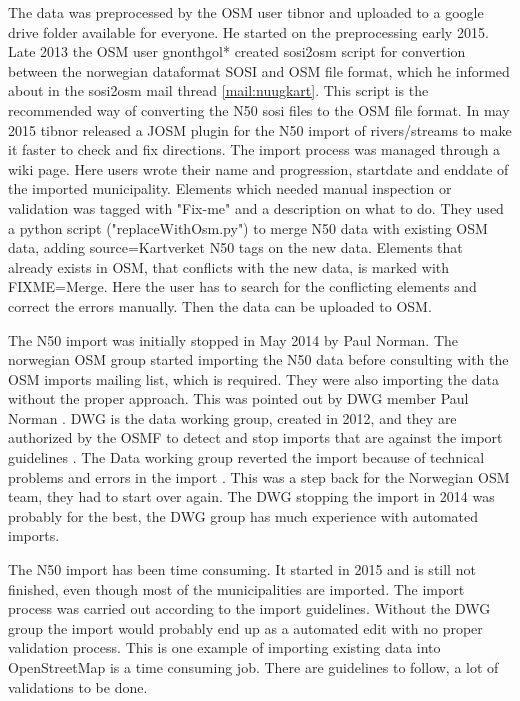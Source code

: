 The data was preprocessed by the OSM user tibnor and uploaded to a google drive folder available for everyone. He started on the preprocessing early 2015. Late 2013 the OSM user gnonthgol* created sosi2osm script for convertion between the norwegian dataformat SOSI and OSM file format, which he informed about in the sosi2osm mail thread \ref{mail:nuugkart}. This script is the recommended way of converting the N50 sosi files to the OSM file format. In may 2015 tibnor released a JOSM plugin for the N50 import of rivers/streams to make it faster to check and fix directions. The import process was managed through a wiki page. Here users wrote their name and progression, startdate and enddate of the imported municipality. Elements which needed manual inspection or validation was tagged with "Fix-me" and a description on what to do. They used a python script ("replaceWithOsm.py") to merge N50 data with existing OSM data, adding source=Kartverket N50 tags on the new data. Elements that already exists in OSM, that conflicts with the new data, is marked with FIXME=Merge. Here the user has to search for the conflicting elements and correct the errors manually. Then the data can be uploaded to OSM. 

The N50 import was initially stopped in May 2014 by Paul Norman. The norwegian OSM group started importing the N50 data before consulting with the OSM imports mailing list, which is required. They were also importing the data without the proper approach. This was pointed out by DWG member Paul Norman \cite{Mehus2014}.  DWG is the data working group, created in 2012, and they are authorized by the OSMF to detect and stop imports that are against the import guidelines \cite{OSMDWG}. The Data working group reverted the import because of technical problems and errors in the import \cite{Didriksen2014}. This was a step back for the Norwegian OSM team, they had to start over again. The DWG stopping the import in 2014 was probably for the best, the DWG group has much experience with automated imports. 

The N50 import has been time consuming. It started in 2015 and is still not finished, even though most of the municipalities are imported. The import process was  carried out according to the import guidelines. Without the DWG group the import would probably end up as a automated edit with no proper validation process. This is one example of importing existing data into OpenStreetMap is a time consuming job. There are guidelines to follow, a lot of validations to be done. 


